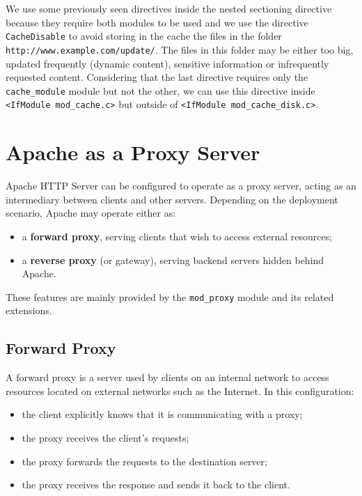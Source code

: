 \documentclass{scrbook}
\begin{document}
	We use some previously seen directives inside the nested sectioning directive because they require both modules to be used and we use the directive \texttt{CacheDisable} to avoid storing in the cache the files in the folder \texttt{http://www.example.com/update/}. The files in this folder may be either too big, updated frequently (dynamic content), sensitive information or infrequently requested content. Considering that the last directive requires only the \texttt{cache\_module} module but not the other, we can use this directive inside \texttt{<IfModule mod\_cache.c>} but outside of \texttt{<IfModule mod\_cache\_disk.c>}.
	
	\section{Apache as a Proxy Server}
	
	Apache HTTP Server can be configured to operate as a proxy server, acting as an intermediary between clients and other servers. Depending on the deployment scenario, Apache may operate either as:
	\begin{itemize}
		\item a \textbf{forward proxy}, serving clients that wish to access external resources;
		
		\item a \textbf{reverse proxy} (or gateway), serving backend servers hidden behind Apache.
	\end{itemize}
	
	These features are mainly provided by the \texttt{mod\_proxy} module and its related extensions.
	
	\subsection{Forward Proxy}
	
	A forward proxy is a server used by clients on an internal network to access resources located on external networks such as the Internet. In this configuration:
	\begin{itemize}
		\item the client explicitly knows that it is communicating with a proxy;
		
		\item the proxy receives the client's requests;
		
		\item the proxy forwards the requests to the destination server;
		
		\item the proxy receives the response and sends it back to the client.
	\end{itemize}
	
\end{document}
